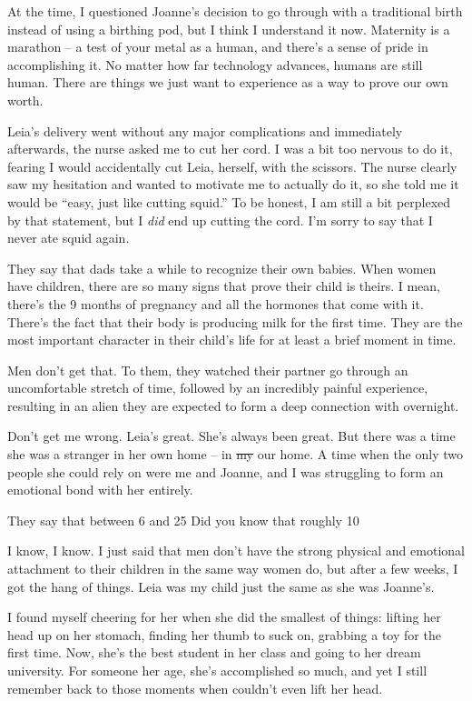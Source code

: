 At the time, I questioned Joanne's decision to go through with a traditional birth instead of using a birthing pod, but I think I understand it now.
Maternity is a marathon -- a test of your metal as a human, and there's a sense of pride in accomplishing it.
No matter how far technology advances, humans are still human.
There are things we just want to experience as a way to prove our own worth.

Leia's delivery went without any major complications and immediately afterwards, the nurse asked me to cut her cord.
I was a bit too nervous to do it, fearing I would accidentally cut Leia, herself, with the scissors.
The nurse clearly saw my hesitation and wanted to motivate me to actually do it, so she told me it would be ``easy, just like cutting squid.''
To be honest, I am still a bit perplexed by that statement, but I \textit{did} end up cutting the cord.
I'm sorry to say that I never ate squid again.

They say that dads take a while to recognize their own babies.
When women have children, there are so many signs that prove their child is theirs.
I mean, there's the 9 months of pregnancy and all the hormones that come with it.
There's the fact that their body is producing milk for the first time.
They are the most important character in their child's life for at least a brief moment in time.

Men don't get that.
To them, they watched their partner go through an uncomfortable stretch of time, followed by an incredibly painful experience, resulting in an alien they are expected to form a deep connection with overnight.

Don't get me wrong.
Leia's great.
She's always been great.
But there was a time she was a stranger in her own home -- in \sout{my} our home.
A time when the only two people she could rely on were me and Joanne, and I was struggling to form an emotional bond with her entirely.

They say that between 6 and 25%
Did you know that roughly 10%

I know, I know.
I just said that men don't have the strong physical and emotional attachment to their children in the same way women do, but after a few weeks, I got the hang of things.
Leia was my child just the same as she was Joanne's.

I found myself cheering for her when she did the smallest of things: lifting her head up on her stomach, finding her thumb to suck on, grabbing a toy for the first time.
Now, she's the best student in her class and going to her dream university.
For someone her age, she's accomplished so much, and yet I still remember back to those moments when couldn't even lift her head.

